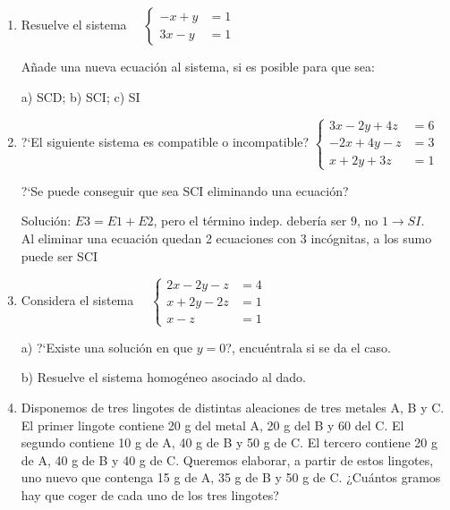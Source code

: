 \begin{enumerate}
\rightline{\textcolor{gris}{Solución: $a) \quad (-5\lambda, -\lambda, \lambda); \; SCI \qquad b) \quad (0,0,0,0)\; \; SCD$  }}

\item Resuelve el sistema $\quad \begin{cases} -x+y&=1\\3x-y&=1  \end{cases}$

Añade una nueva ecuación al sistema, si es posible para que sea:

a) SCD; \hspace{10mm} b) SCI; \hspace{10mm} c) SI

\rightline{\textcolor{gris}{Solución: Solución sistema $(1,2);\;  a) x=1; \; b) No; \; c) x=3$   }}

\item ?`El siguiente sistema es compatible o incompatible? $\begin{cases} 3x-2y+4z&=6\\-2x+4y-z&=3\\x+2y+3z&=1  \end{cases}$

?`Se puede conseguir que sea SCI eliminando una ecuación?

\rightline\footnotesize{{\textcolor{gris}{Solución: $E3=E1+E2$, pero el término indep. debería ser $9$, no $1 \to SI. \quad$ Al eliminar una ecuación quedan 2 ecuaciones con 3 incógnitas, a los sumo puede ser SCI  }}}

\item Considera el sistema $\quad \begin{cases} 2x-2y-z&=4\\x+2y-2z&=1\\x-z&=1  \end{cases}$

a) ?`Existe una solución en que $y=0$?, encuéntrala si se da el caso.

b) Resuelve el sistema homogéneo asociado al dado.

\rightline{\textcolor{gris}{Solución: $a)\; (3,0,2),\; SCD \quad b)\; (2\lambda, \lambda, 2\lambda), \; SCI$  }}


\item Disponemos de tres lingotes de distintas aleaciones de tres metales A, B y C.  El primer lingote contiene 20 g del metal A, 20 g del B y 60 del C. El segundo contiene 10 g de A,  40 g de B y 50 g de C.  El tercero contiene 20 g de A,  40 g de B y 40 g de C.  Queremos elaborar, a partir de estos lingotes,  uno nuevo que contenga 15 g de A, 35 g de B y 50 g de C. ¿Cuántos gramos hay que coger de cada uno de los tres lingotes? 


\end{enumerate}
